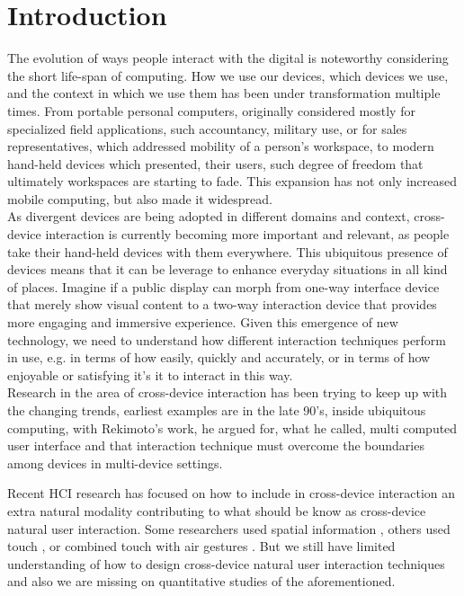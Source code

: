 \section{Introduction} \label{sec:introduction}
The evolution of ways people interact with the digital is noteworthy considering the short life-span of computing. How we use our devices, which devices we use, and the context in which we use them has been under transformation multiple times. From portable personal computers, originally considered mostly for specialized field applications, such accountancy, military use, or for sales representatives, which addressed mobility of a person's workspace, to modern hand-held devices which presented, their users, such degree of freedom that ultimately workspaces are starting to fade. This expansion has not only increased mobile computing, but also made it widespread. \\

As divergent devices are being adopted in different domains and context, cross-device interaction is currently becoming more important and relevant, as people take their hand-held devices with them everywhere. This ubiquitous presence of devices means that it can be leverage to enhance everyday situations in all kind of places. Imagine if a public display can morph from one-way interface device that merely show visual content to a two-way interaction device that provides more engaging and immersive experience. Given this emergence of new technology, we need to understand how different interaction techniques perform in use, e.g. in terms of how easily, quickly and accurately, or in terms of how enjoyable or satisfying it's it to interact in this way. \\

Research in the area of cross-device interaction has been trying to keep up with the changing trends, earliest examples are in the late 90's, inside ubiquitous computing, with Rekimoto's work,  he argued for, what he called, multi computed user interface and that interaction technique must overcome the boundaries among devices in multi-device settings\cite{Rekimoto:1998}.

Recent HCI research has focused on how to include in cross-device interaction an extra natural modality contributing to what should be know as cross-device natural user interaction.  Some researchers used spatial information \cite{Marquardt:2011, Marquardt:2012}, others used touch \cite{Seifert:2012}, or combined touch with air gestures \cite{Bragdon:2011} . But we still have limited understanding of how to design cross-device natural user interaction techniques and also we are missing on quantitative studies of the aforementioned.\\

